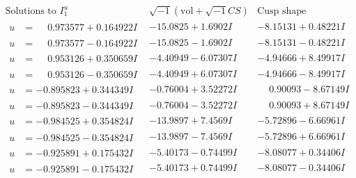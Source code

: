 \documentclass[1p]{elsarticle_modified}
\theoremstyle{definition}
\newcommand{\I}{\sqrt{-1}}
\begin{document}
$$\begin{array}{c|c|c}  
\text{Solutions to }I^u_{1}& \I (\text{vol} + \sqrt{-1}CS) & \text{Cusp shape}\\
 \hline 
\begin{aligned}
u &= \phantom{-}0.973577 + 0.164922 I\end{aligned}
 & -15.0825 + 1.6902 I & -8.15131 + 0.48221 I \\ \hline\begin{aligned}
u &= \phantom{-}0.973577 - 0.164922 I\end{aligned}
 & -15.0825 - 1.6902 I & -8.15131 - 0.48221 I \\ \hline\begin{aligned}
u &= \phantom{-}0.953126 + 0.350659 I\end{aligned}
 & -4.40949 - 6.07307 I & -4.94666 + 8.49917 I \\ \hline\begin{aligned}
u &= \phantom{-}0.953126 - 0.350659 I\end{aligned}
 & -4.40949 + 6.07307 I & -4.94666 - 8.49917 I \\ \hline\begin{aligned}
u &= -0.895823 + 0.344349 I\end{aligned}
 & -0.76004 + 3.52272 I & \phantom{-}0.90093 - 8.67149 I \\ \hline\begin{aligned}
u &= -0.895823 - 0.344349 I\end{aligned}
 & -0.76004 - 3.52272 I & \phantom{-}0.90093 + 8.67149 I \\ \hline\begin{aligned}
u &= -0.984525 + 0.354824 I\end{aligned}
 & -13.9897 + 7.4569 I & -5.72896 - 6.66961 I \\ \hline\begin{aligned}
u &= -0.984525 - 0.354824 I\end{aligned}
 & -13.9897 - 7.4569 I & -5.72896 + 6.66961 I \\ \hline\begin{aligned}
u &= -0.925891 + 0.175432 I\end{aligned}
 & -5.40173 - 0.74499 I & -8.08077 + 0.34406 I \\ \hline\begin{aligned}
u &= -0.925891 - 0.175432 I\end{aligned}
 & -5.40173 + 0.74499 I & -8.08077 - 0.34406 I \\ \hline\begin{aligned}

\end{aligned}
\end{array}$$
\end{document}

